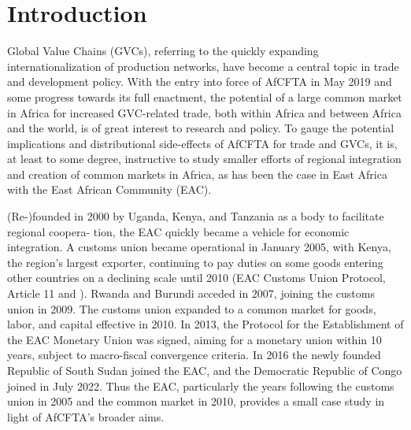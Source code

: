 \documentclass[a4paper]{article}
\begin{document}


\section{Introduction}

Global Value Chains (GVCs), referring to the quickly expanding internationalization of production networks, have become a central topic in trade and development policy. With the entry into force of AfCFTA in May 2019 and some progress towards its full enactment, the potential of a large common market in Africa for increased GVC-related trade, both within Africa and between Africa and the world, is of great interest to research and policy. To gauge the potential implications and distributional side-effects of AfCFTA for trade and GVCs, it is, at least to some degree, instructive to study smaller efforts of regional integration and creation of common markets in Africa, as has been the case in East Africa with the East African Community (EAC). \newline 

(Re-)founded in 2000 by Uganda, Kenya, and Tanzania as a body to facilitate regional coopera-
tion, the EAC quickly became a vehicle for economic integration. A customs union became operational in January 2005, with Kenya, the region's largest exporter, continuing to pay duties on some goods entering other countries on a declining scale until 2010 (EAC Customs Union Protocol, Article 11 and \citet{aloo2017free}). Rwanda and Burundi acceded in 2007, joining the customs union in 2009. The customs union expanded to a common market for goods, labor, and capital effective in 2010. In 2013, the Protocol for the Establishment of the EAC Monetary Union was signed, aiming for a monetary union within 10 years, subject to macro-fiscal convergence criteria. In 2016 the newly founded Republic of South Sudan joined the EAC, and the Democratic Republic of Congo joined in July 2022. Thus the EAC, particularly the years following the customs union in 2005 and the common market in 2010, provides a small case study in light of AfCFTA's broader aims. \newline 
\end{document}
